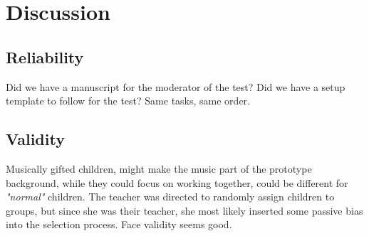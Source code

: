 \chapter{Discussion}
    \section{Reliability}
    
        Did we have a manuscript for the moderator of the test?
        Did we have a setup template to follow for the test?
        Same tasks, same order.
        
    \section{Validity}
        Musically gifted children, might make the music part of the prototype background, while they could focus on working together, could be different for \textit{"normal"} children.
        The teacher was directed to randomly assign children to groups, but since she was their teacher, she most likely inserted some passive bias into the selection process.
        Face validity seems good.
        
        